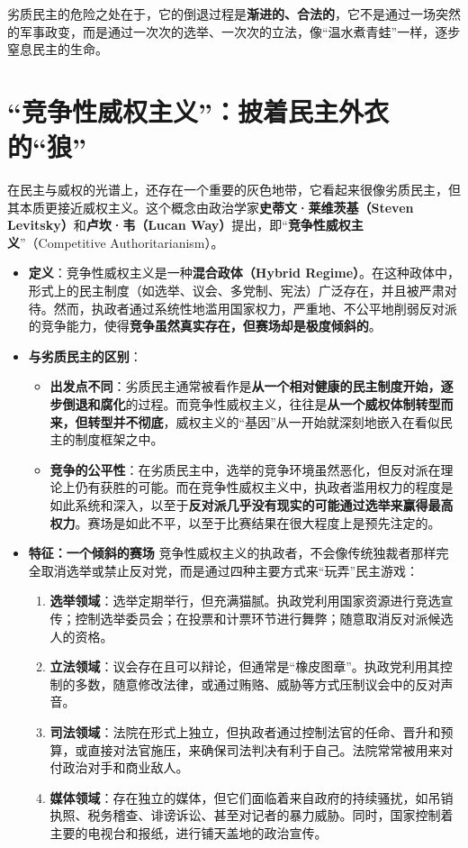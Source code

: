 劣质民主的危险之处在于，它的倒退过程是\textbf{渐进的、合法的}，它不是通过一场突然的军事政变，而是通过一次次的选举、一次次的立法，像“温水煮青蛙”一样，逐步窒息民主的生命。

\hrulefill

\section{“竞争性威权主义”：披着民主外衣的“狼”}

在民主与威权的光谱上，还存在一个重要的灰色地带，它看起来很像劣质民主，但其本质更接近威权主义。这个概念由政治学家\textbf{史蒂文·莱维茨基（Steven Levitsky）}和\textbf{卢坎·韦（Lucan Way）}提出，即“\textbf{竞争性威权主义}”（Competitive Authoritarianism）。

\begin{itemize}
    \item \textbf{定义}：竞争性威权主义是一种\textbf{混合政体（Hybrid Regime）}。在这种政体中，形式上的民主制度（如选举、议会、多党制、宪法）广泛存在，并且被严肃对待。然而，执政者通过系统性地滥用国家权力，严重地、不公平地削弱反对派的竞争能力，使得\textbf{竞争虽然真实存在，但赛场却是极度倾斜的}。
    \item \textbf{与劣质民主的区别}：
    \begin{itemize}
        \item \textbf{出发点不同}：劣质民主通常被看作是\textbf{从一个相对健康的民主制度开始，逐步倒退和腐化}的过程。而竞争性威权主义，往往是\textbf{从一个威权体制转型而来，但转型并不彻底}，威权主义的“基因”从一开始就深刻地嵌入在看似民主的制度框架之中。
        \item \textbf{竞争的公平性}：在劣质民主中，选举的竞争环境虽然恶化，但反对派在理论上仍有获胜的可能。而在竞争性威权主义中，执政者滥用权力的程度是如此系统和深入，以至于\textbf{反对派几乎没有现实的可能通过选举来赢得最高权力}。赛场是如此不平，以至于比赛结果在很大程度上是预先注定的。
    \end{itemize}

    \item \textbf{特征：一个倾斜的赛场}
    竞争性威权主义的执政者，不会像传统独裁者那样完全取消选举或禁止反对党，而是通过四种主要方式来“玩弄”民主游戏：
    \begin{enumerate}
        \item \textbf{选举领域}：选举定期举行，但充满猫腻。执政党利用国家资源进行竞选宣传；控制选举委员会；在投票和计票环节进行舞弊；随意取消反对派候选人的资格。
        \item \textbf{立法领域}：议会存在且可以辩论，但通常是“橡皮图章”。执政党利用其控制的多数，随意修改法律，或通过贿赂、威胁等方式压制议会中的反对声音。
        \item \textbf{司法领域}：法院在形式上独立，但执政者通过控制法官的任命、晋升和预算，或直接对法官施压，来确保司法判决有利于自己。法院常常被用来对付政治对手和商业敌人。
        \item \textbf{媒体领域}：存在独立的媒体，但它们面临着来自政府的持续骚扰，如吊销执照、税务稽查、诽谤诉讼、甚至对记者的暴力威胁。同时，国家控制着主要的电视台和报纸，进行铺天盖地的政治宣传。
    \end{enumerate}


\end{itemize}
